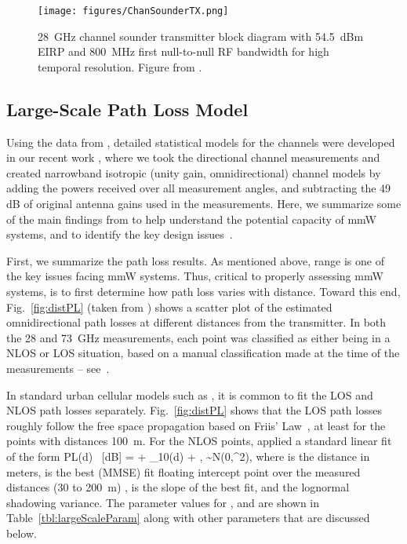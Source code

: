 \documentclass[journal]{IEEEtran}
\def\beq{}
\begin{document}
\begin{figure}
\begin{center}
    \texttt{[image: figures/ChanSounderTX.png]}
\end{center}
\caption{28~GHz channel sounder transmitter block diagram with 54.5~dBm EIRP and
800~MHz first null-to-null RF bandwidth for high temporal resolution.
Figure from \cite{Rappaport:12-28G}.
}
\label{fig:ChanSoundTX}
\end{figure}

\subsection{Large-Scale Path Loss Model}

Using the data from
\cite{ben2011millimeter,Rappaport:12-28G,Rappaport:28NYCPenetrationLoss,Samimi:AoAD,Nie72G-PIMRC:13,Rappaport:13-BBmmW,rappaportmillimeter},
detailed statistical models for the channels were developed in our recent work
\cite{AkLiuRanRapEr:13-arxiv},
where we took the directional channel measurements and created narrowband
isotropic (unity gain, omnidirectional)
channel models by adding the powers received over all measurement angles,
and subtracting the 49 dB of original antenna gains used in the measurements.
Here, we summarize some of the main findings from \cite{AkLiuRanRapEr:13-arxiv}
to help understand the potential capacity of mmW systems, and to
identify the key design issues~\cite{Rappaport:13-BBmmW}.

First, we summarize the path loss results.
As mentioned above, range is one of the key issues facing mmW systems.
Thus, critical to properly assessing mmW systems, is to first determine how
path loss varies with distance.  Toward this end, Fig.~\ref{fig:distPL}
(taken from \cite{AkLiuRanRapEr:13-arxiv})
shows a scatter plot of the estimated omnidirectional path losses
at different distances from the transmitter.    In both the 28 and 73~GHz measurements,
each point was classified as either being in a NLOS or LOS situation,
based on a manual classification made at the time of the measurements --
see~\cite{ben2011millimeter,Rappaport:12-28G,Rappaport:28NYCPenetrationLoss,Samimi:AoAD,Nie72G-PIMRC:13,Rappaport:13-BBmmW,rappaportmillimeter}.

In standard urban cellular models such as \cite{3GPP36.814}, it is
common to fit the LOS and NLOS path losses separately.
Fig.~\ref{fig:distPL} shows that the LOS path losses roughly follow
the free space propagation based on Friis' Law~\cite{Rappaport:02},
at least for the points with distances  100~m.
For the NLOS points, \cite{AkLiuRanRapEr:13-arxiv} applied
a standard linear fit of the form
\beq \label{eq:plLin}
    PL(d) \mbox{ [dB]} = \alpha + \log_{10}(d) + \xi, \quad \xi \sim {\mathcal N}(0,\sigma^2),
\eeq
where  is the distance in meters,  is the best (MMSE) fit floating intercept
point over the measured distances (30 to 200~m) \cite{Rappaport-72GHz:13},
 is the slope of the best fit, and
 the lognormal shadowing variance.  The parameter values for
,  and  are shown in Table~\ref{tbl:largeScaleParam} along with
other parameters that are discussed below.
\end{document}

